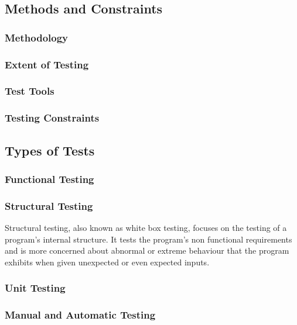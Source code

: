 \documentclass[12pt]{article}
\begin{document}
\subsection{ Methods and Constraints} 

\subsubsection{Methodology} 

\subsubsection{Extent of Testing}

\subsubsection{Test Tools}


\subsubsection{ Testing Constraints}

\subsection{Types of Tests}

\subsubsection{Functional Testing}

\subsubsection{Structural Testing}
Structural testing, also known as white box testing, focuses on the testing of a program's internal structure. It tests the program's non functional requirements and is more concerned about abnormal or extreme behaviour that the program exhibits when given unexpected or even expected inputs.
\subsubsection{Unit Testing}

\subsubsection{Manual and Automatic Testing}
\end{document}
